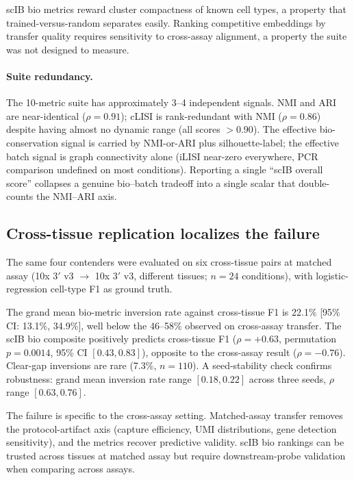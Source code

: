 \documentclass[11pt]{article}
\begin{document}
scIB bio metrics reward cluster compactness of known cell types, a property that trained-versus-random separates easily. Ranking competitive embeddings by transfer quality requires sensitivity to cross-assay alignment, a property the suite was not designed to measure.

\paragraph{Suite redundancy.} The 10-metric suite has approximately 3--4 independent signals. NMI and ARI are near-identical ($\rho = 0.91$); cLISI is rank-redundant with NMI ($\rho = 0.86$) despite having almost no dynamic range (all scores $> 0.90$). The effective bio-conservation signal is carried by NMI-or-ARI plus silhouette-label; the effective batch signal is graph connectivity alone (iLISI near-zero everywhere, PCR comparison undefined on most conditions). Reporting a single ``scIB overall score'' collapses a genuine bio--batch tradeoff into a single scalar that double-counts the NMI--ARI axis.


\subsection{Cross-tissue replication localizes the failure}
\label{sec:crosstissue}

The same four contenders were evaluated on six cross-tissue pairs at matched assay (10x 3$'$ v3 $\rightarrow$ 10x 3$'$ v3, different tissues; $n = 24$ conditions), with logistic-regression cell-type F1 as ground truth.

The grand mean bio-metric inversion rate against cross-tissue F1 is 22.1\% [95\% CI: 13.1\%, 34.9\%], well below the 46--58\% observed on cross-assay transfer. The scIB bio composite positively predicts cross-tissue F1 ($\rho = +0.63$, permutation $p = 0.0014$, 95\% CI $[0.43, 0.83]$), opposite to the cross-assay result ($\rho = -0.76$). Clear-gap inversions are rare (7.3\%, $n = 110$). A seed-stability check confirms robustness: grand mean inversion rate range $[0.18, 0.22]$ across three seeds, $\rho$ range $[0.63, 0.76]$.

The failure is specific to the cross-assay setting. Matched-assay transfer removes the protocol-artifact axis (capture efficiency, UMI distributions, gene detection sensitivity), and the metrics recover predictive validity. scIB bio rankings can be trusted across tissues at matched assay but require downstream-probe validation when comparing across assays.
\end{document}
